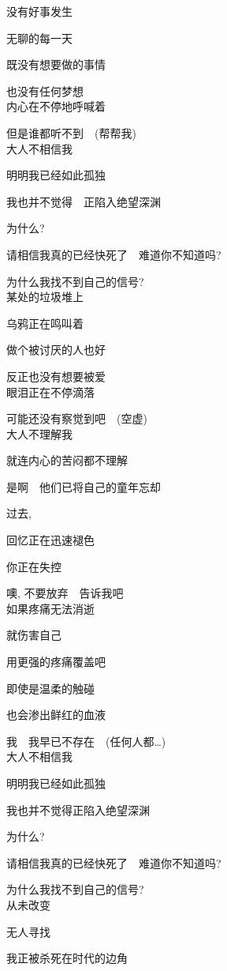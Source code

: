 没有好事发生

无聊的每一天

既没有想要做的事情

也没有任何梦想
\\

内心在不停地呼喊着

但是谁都听不到　(帮帮我)
\\

大人不相信我

明明我已经如此孤独

我也并不觉得　正陷入绝望深渊

为什么?

请相信我真的已经快死了　难道你不知道吗?

为什么我找不到自己的信号?
\\

某处的垃圾堆上

乌鸦正在鸣叫着

做个被讨厌的人也好

反正也没有想要被爱
\\

眼泪正在不停滴落

可能还没有察觉到吧　(空虚)
\\

大人不理解我

就连内心的苦闷都不理解

是啊　他们已将自己的童年忘却

过去,

回忆正在迅速褪色

你正在失控

噢, 不要放弃　告诉我吧
\\

如果疼痛无法消逝

就伤害自己

用更强的疼痛覆盖吧

即使是温柔的触碰

也会渗出鲜红的血液

我　我早已不存在　(任何人都…)
\\

大人不相信我

明明我已经如此孤独

我也并不觉得正陷入绝望深渊

为什么?

请相信我真的已经快死了　难道你不知道吗?

为什么我找不到自己的信号?
\\

从未改变

无人寻找

我正被杀死在时代的边角
\\
